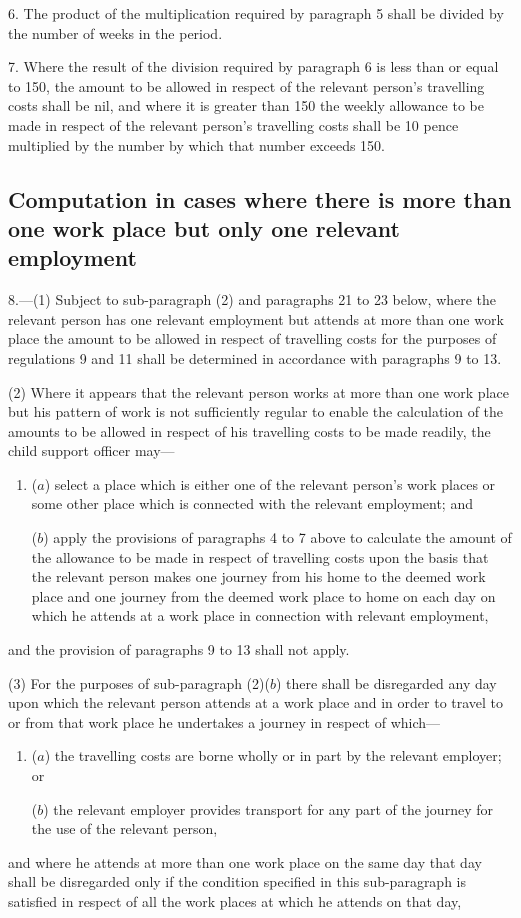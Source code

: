 \documentclass[a4paper]{article}
\begin{document}
\medskip


6.  The product of the multiplication required by paragraph 5 shall be divided by the number of weeks in the period.

\medskip

7.  Where the result of the division required by paragraph 6 is less than or equal to 150, the amount to be allowed in respect of the relevant person’s travelling costs shall be nil, and where it is greater than 150 the weekly allowance to be made in respect of the relevant person’s travelling costs shall be 10 pence multiplied by the number by which that number exceeds 150.

\subsection*{Computation in cases where there is more than one work place but only one relevant employment}

8.—(1) Subject to sub-paragraph (2) and paragraphs 21 to 23 below, where the relevant person has one relevant employment but attends at more than one work place the amount to be allowed in respect of travelling costs for the purposes of regulations 9 and 11 shall be determined in accordance with paragraphs 9 to 13.

(2) Where it appears that the relevant person works at more than one work place but his pattern of work is not sufficiently regular to enable the calculation of the amounts to be allowed in respect of his travelling costs to be made readily, the child support officer may—
\begin{enumerate}\item[]
($a$) select a place which is either one of the relevant person’s work places or some other place which is connected with the relevant employment; and

($b$) apply the provisions of paragraphs 4 to 7 above to calculate the amount of the allowance to be made in respect of travelling costs upon the basis that the relevant person makes one journey from his home to the deemed work place and one journey from the deemed work place to home on each day on which he attends at a work place in connection with relevant employment,
\end{enumerate}
and the provision of paragraphs 9 to 13 shall not apply.

(3) For the purposes of sub-paragraph (2)($b$) there shall be disregarded any day upon which the relevant person attends at a work place and in order to travel to or from that work place he undertakes a journey in respect of which—
\begin{enumerate}\item[]
($a$) the travelling costs are borne wholly or in part by the relevant employer; or

($b$) the relevant employer provides transport for any part of the journey for the use of the relevant person,
\end{enumerate}
and where he attends at more than one work place on the same day that day shall be disregarded only if the condition specified in this sub-paragraph is satisfied in respect of all the work places at which he attends on that day,
\end{document}
